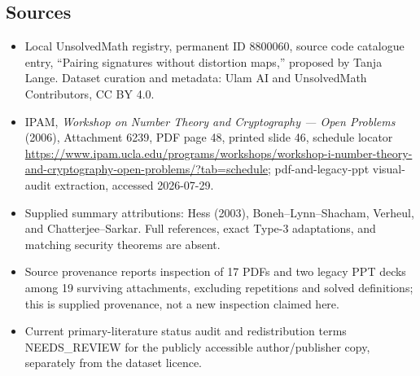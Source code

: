 \documentclass[11pt]{article}
\begin{document}
\subsection{Sources}
\begin{itemize}
\item Local UnsolvedMath registry, permanent ID 8800060, source code catalogue entry, ``Pairing signatures without distortion maps,'' proposed by Tanja Lange. Dataset curation and metadata: Ulam AI and UnsolvedMath Contributors, CC BY 4.0.
\item IPAM, \emph{Workshop on Number Theory and Cryptography --- Open Problems} (2006), Attachment 6239, PDF page 48, printed slide 46, schedule locator \url{https://www.ipam.ucla.edu/programs/workshops/workshop-i-number-theory-and-cryptography-open-problems/?tab=schedule}; pdf-and-legacy-ppt visual-audit extraction, accessed 2026-07-29.
\item Supplied summary attributions: Hess (2003), Boneh--Lynn--Shacham, Verheul, and Chatterjee--Sarkar. Full references, exact Type-3 adaptations, and matching security theorems are absent.
\item Source provenance reports inspection of 17 PDFs and two legacy PPT decks among 19 surviving attachments, excluding repetitions and solved definitions; this is supplied provenance, not a new inspection claimed here.
\item Current primary-literature status audit and redistribution terms NEEDS\_REVIEW for the publicly accessible author/publisher copy, separately from the dataset licence.
\end{itemize}
\end{document}

